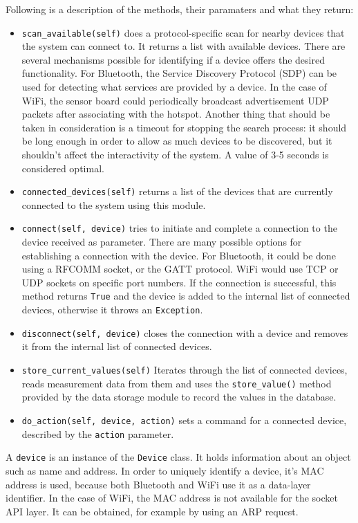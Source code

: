 Following is a description of the methods, their paramaters and what they return:
\begin{itemize}

    \item \texttt{scan_available(self)} does a protocol-specific scan for nearby devices that the system can connect to. It returns a list
    with available devices. There are several mechanisms possible for identifying if a device offers the desired functionality. For Bluetooth, the Service Discovery Protocol (SDP)  can be used for detecting what services are provided by a device. In the case of WiFi, the sensor board could periodically broadcast advertisement UDP packets after associating with the hotspot. Another thing that should be taken in consideration is a timeout for stopping the search process: it should be long enough in order to allow as much devices to be discovered, but it shouldn't affect the interactivity of the system. A value of 3-5 seconds is considered optimal.
    \item \texttt{connected_devices(self)} returns a list of the devices that are currently connected to the system using this module.
    \item \texttt{connect(self, device)} tries to initiate and complete a connection to the device received as parameter. There are many possible options for establishing a connection with the device. For Bluetooth, it could be done using a RFCOMM socket, or the GATT protocol. WiFi would use TCP or UDP sockets on specific port numbers. If the connection is successful, this method returns \texttt{True} and the device is added to the internal list of connected devices, otherwise it throws an \texttt{Exception}.
    \item \texttt{disconnect(self, device)} closes the connection with a device and removes it from the internal list of connected devices.
    \item \texttt{store_current_values(self)} Iterates through the list of connected devices, reads measurement data from them and uses the \texttt{store_value()} method provided by the data storage module to record the values in the database.
    \item \texttt{do_action(self, device, action)} sets a command for a connected device, described by the \texttt{action} parameter.
\end{itemize}

A \texttt{device} is an instance of the \texttt{Device} class. It holds information about an object such as name and address. In order to uniquely identify a device, it's MAC address is used, because both Bluetooth and WiFi use it as a data-layer identifier. In the case of WiFi, the MAC address is not available for the socket API layer. It can be obtained, for example by using an ARP request.

